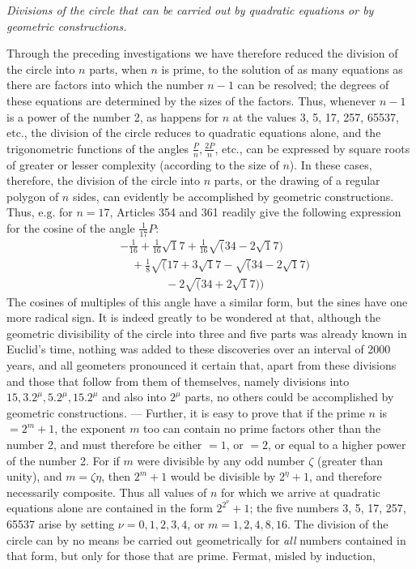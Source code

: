 \begin{center}\textit{Divisions of the circle that can be carried out by quadratic equations or by\\geometric constructions.}\end{center}


Through the preceding investigations we have therefore reduced the division of the circle into \(n\) parts, when \(n\) is prime, to the solution of as many equations as there are factors into which the number \(n-1\) can be resolved; the degrees of these equations are determined by the sizes of the factors. Thus, whenever \(n-1\) is a power of the number 2, as happens for \(n\) at the values 3, 5, 17, 257, 65537, etc., the division of the circle reduces to quadratic equations alone, and the trigonometric functions of the angles \(\frac Pn,\allowbreak \frac{2P}n\), etc., can be expressed by square roots of greater or lesser complexity (according to the size of \(n\)). In these cases, therefore, the division of the circle into \(n\) parts, or the drawing of a regular polygon of \(n\) sides, can evidently be accomplished by geometric constructions. Thus, \(\text{e.g.}\) for \(n=17\), Articles 354 and 361 readily give the following expression for the cosine of the angle \(\tfrac1{17}P\): \[\begin{aligned}&-\tfrac1{16}+\tfrac1{16}\surd17+\tfrac1{16}\surd(34-2\surd17)\\&\quad+\tfrac18\surd(17+3\surd17-\surd(34-2\surd17)\\&\qquad\qquad-2\surd(34+2\surd17))\end{aligned}\] The cosines of multiples of this angle have a similar form, but the sines have one more radical sign. It is indeed greatly to be wondered at that, although the geometric divisibility of the circle into three and five parts was already known in Euclid's time, nothing was added to these discoveries over an interval of 2000 years, and all geometers pronounced it certain that, apart from these divisions and those that follow from them of themselves, namely divisions into \(15,\allowbreak 3.2^\mu,\allowbreak 5.2^\mu,\allowbreak 15.2^\mu\) and also into \(2^\mu\) parts, no others could be accomplished by geometric constructions. — Further, it is easy to prove that if the prime \(n\) is \(=2^m+1\), the exponent \(m\) too can contain no prime factors other than the number 2, and must therefore be either \(=1\), or \(=2\), or equal to a higher power of the number 2. For if \(m\) were divisible by any odd number \(\zeta\) (greater than unity), and \(m=\zeta\eta\), then \(2^m+1\) would be divisible by \(2^\eta+1\), and therefore necessarily composite. Thus all values of \(n\) for which we arrive at quadratic equations alone are contained in the form \(2^{2^\nu}+1\); the five numbers 3, 5, 17, 257, 65537 arise by setting \(\nu=0,\allowbreak 1,\allowbreak 2,\allowbreak 3,\allowbreak 4\), or \(m=1,\allowbreak 2,\allowbreak 4,\allowbreak 8,\allowbreak 16\). The division of the circle can by no means be carried out geometrically for \textit{all} numbers contained in that form, but only for those that are prime. Fermat, misled by induction, 